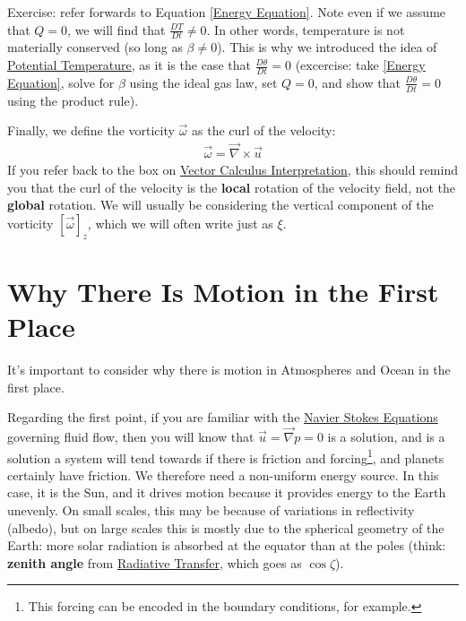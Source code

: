 Exercise: refer forwards to Equation \ref{Energy Equation}. Note even if we assume that $Q=0$, we will find that $\frac{DT}{Dt}\neq 0$. In other words, temperature is not materially conserved (so long as $\beta\neq0$). This is why we introduced the idea of \hyperref[Potential Temperature]{Potential Temperature}, as it is the case that $\frac{D\theta}{Dt}=0$ (excercise: take \ref{Energy Equation}, solve for $\beta$ using the ideal gas law, set $Q=0$, and show that $\frac{D\theta}{Dt}=0$ using the product rule).

Finally, we define the vorticity $\vec{\omega}$ as the curl of the velocity:
\begin{align}
    \vec{\omega}=\vec{\nabla}\times\vec{u}
\end{align}
If you refer back to the box on \hyperref[VC Interp]{Vector Calculus Interpretation}, this should remind you that the curl of the velocity is the \textbf{local} rotation of the velocity field, not the \textbf{global} rotation. We will usually be considering the vertical component of the vorticity $[\vec{\omega}]_z$, which we will often write just as $\xi$.

\section{Why There Is Motion in the First Place}\label{Differential Heating}

It's important to consider why there is motion in Atmospheres and Ocean in the first place.

Regarding the first point, if you are familiar with the \hyperref[Navier Stokes]{Navier Stokes Equations} governing fluid flow, then you will know that $\vec{u}=\vec{\nabla}p=0$ is a solution, and is a solution a system will tend towards if there is friction and forcing\footnote{This forcing can be encoded in the boundary conditions, for example.}, and planets certainly have friction. We therefore need a non-uniform energy source. In this case, it is the Sun, and it drives motion because it provides energy to the Earth unevenly. On small scales, this may be because of variations in reflectivity (albedo), but on large scales this is mostly due to the spherical geometry of the Earth: more solar radiation is absorbed at the equator than at the poles (think: \textbf{zenith angle} from \hyperref[Radiative Transfer]{Radiative Transfer}, which goes as $\cos\zeta$).


